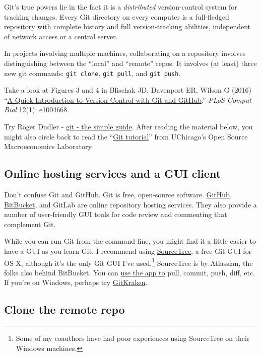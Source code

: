 
Git's true powers lie in the fact it is a \textit{distributed} version-control system for tracking changes.
Every Git directory on every computer is a full-fledged repository with complete history and full version-tracking abilities, independent of network access or a central server.

In projects involving multiple machines,
collaborating on a repository involves distinguishing between the ``local'' and ``remote'' repos.
It involves (at least) three new git commands: \texttt{git clone}, \texttt{git pull}, and \texttt{git push}.

Take a look at Figures 3 and 4 in
Blischak JD, Davenport ER, Wilson G (2016)
``\href{http://journals.plos.org/ploscompbiol/article?id=10.1371/journal.pcbi.1004668}{A Quick Introduction to Version Control with Git and GitHub}.'' \textit{PLoS Comput Biol} 12(1): e1004668.

Try Roger Dudler - \href{http://rogerdudler.github.io/git-guide/}{git - the simple guide}.
After reading the material below, you might also circle back to read
the ``\href{https://github.com/OpenSourceMacro/BootCamp2017/blob/master/Tutorials/git_tutorial.pdf}{Git tutorial}''
from UChicago's Open Source Macroeconomics Laboratory.

\subsection{Online hosting services and a GUI client}

Don't confuse Git and GitHub.
Git is free, open-source software.
\href{http://www.github.com}{GitHub}, \href{https://bitbucket.org/}{BitBucket}, and GitLab are
online repository hosting services.
They also provide a number of user-friendly GUI tools for code review and commenting that complement Git.

While you can run Git from the command line,
you might find it a little easier to have a GUI as you learn Git.
I recommend using \href{https://www.sourcetreeapp.com/}{SourceTree},
a free Git GUI for OS X, although it's the only Git GUI I've used.\footnote{
	Some of my coauthors have had poor experiences using SourceTree on their Windows machines.
}
SourceTree is by Atlassian, the folks also behind BitBucket.
You can \href{https://confluence.atlassian.com/get-started-with-sourcetree/work-using-git-847359053.html}{use the app to} pull, commit, push, diff, etc.
If you're on Windows, perhaps try \href{https://www.gitkraken.com/}{GitKraken}.

\subsection{Clone the remote repo}


